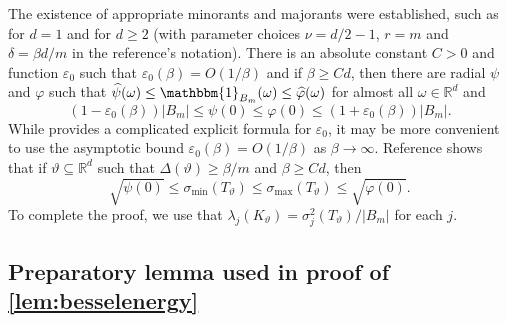 \documentclass[11pt]{article}
\theoremstyle{definition}
\numberwithin{theorem}{section}
\numberwithin{lemma}{section}
\numberwithin{equation}{section}
\def\R{\mathbb{R}}
\renewcommand{\subset}{\subseteq}
\renewcommand{\hat}{\widehat}
\renewcommand{\epsilon}{\varepsilon}
\numberwithin{equation}{section}
\begin{document}
		The existence of appropriate minorants and majorants were established, such as \cite{vaaler1985some} for $d=1$ and \cite[Theorem 3]{holt1996beurling} for $d\geq 2$ (with parameter choices $\nu=d/2-1$, $r=m$ and $\delta=\beta d/m$ in the reference's notation). There is an absolute constant $C>0$ and function $\epsilon_0$ such that $\epsilon_0(\beta)=O(1/\beta)$
		and if $\beta\geq Cd$, then there are radial $\psi$ and $\varphi$ such that $\hat\psi(\omega)\leq \mathbbm{1}_{B_m}(\omega)\leq \hat \varphi(\omega)$ for almost all $\omega\in\R^d$ and   		
		$$
		(1-\epsilon_0(\beta))|B_m|
		\leq \psi(0)
		\leq \varphi(0)
		\leq (1+\epsilon_0(\beta))|B_m|.
		$$
		While \cite{vaaler1985some} provides a complicated explicit formula for $\epsilon_0$, it may be more convenient to use the asymptotic bound $\epsilon_0(\beta)=O(1/\beta)$ as $\beta\to\infty$. Reference \cite[Lemma 2.1]{li2025nonharmonic} shows that if $\vartheta\subset\R^d$ such that $\Delta(\vartheta)\geq \beta/m$ and $\beta\geq Cd$, then
		$$
		\sqrt{\psi(0)}
		\leq \sigma_{\min}(T_\vartheta)
		\leq \sigma_{\max}(T_\vartheta)
		\leq \sqrt{\varphi(0)}. 
		$$ 
		To complete the proof, we use that $\lambda_j(K_\vartheta) = \sigma_j^2(T_\vartheta)/|B_m|$ for each $j$. 

	
	\subsection{Preparatory lemma used in proof of \cref{lem:besselenergy}}
	\label{proof:besselenergy}
	
\end{document}
